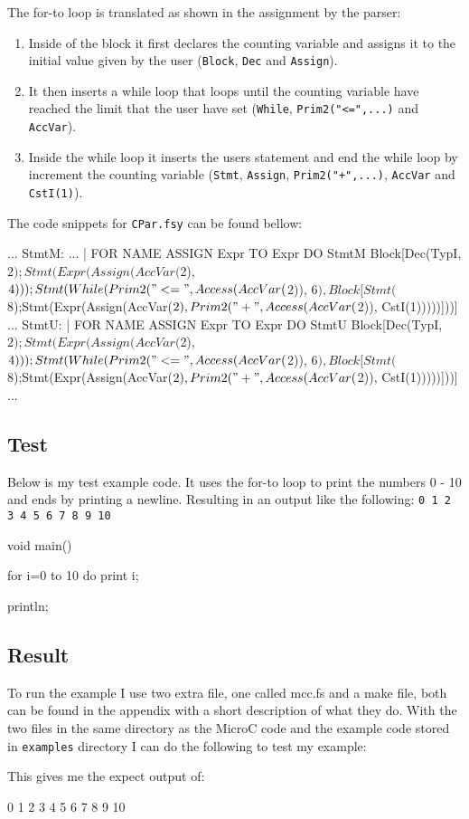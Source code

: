 The for-to loop is translated as shown in the assignment by the parser: 
\begin{enumerate}
    \item Inside of the block it first declares the counting variable and
        assigns it to the initial value given by the user (\texttt{Block},
        \texttt{Dec} and \texttt{Assign}).
    \item It then inserts a while loop that loops until the counting variable
        have reached the limit that the user have set (\texttt{While},
        \texttt{Prim2("<=",...)} and \texttt{AccVar}).
    \item Inside the while loop it inserts the users statement and end the while
        loop by increment the counting variable (\texttt{Stmt}, \texttt{Assign},
        \texttt{Prim2("+",...)}, \texttt{AccVar} and \texttt{CstI(1)}).
\end{enumerate}
The code snippets for \texttt{CPar.fsy} can be found bellow:
\begin{ccode}
...
StmtM:
...
  | FOR NAME ASSIGN Expr TO Expr DO StmtM { Block[Dec(TypI, $2); Stmt(Expr(Assign(AccVar($2), $4))); Stmt(While(Prim2("<=", Access(AccVar($2)), $6), Block[Stmt($8);Stmt(Expr(Assign(AccVar($2), Prim2("+", Access(AccVar($2)), CstI(1)))))]))] }
...
StmtU:
  | FOR NAME ASSIGN Expr TO Expr DO StmtU { Block[Dec(TypI, $2); Stmt(Expr(Assign(AccVar($2), $4))); Stmt(While(Prim2("<=", Access(AccVar($2)), $6), Block[Stmt($8);Stmt(Expr(Assign(AccVar($2), Prim2("+", Access(AccVar($2)), CstI(1)))))]))] }
...
\end{ccode}
\subsection{Test}
Below is my test example code. It uses the for-to loop to print the numbers 0 - 10
and ends by printing a newline. Resulting in an output like the following:
\texttt{0 1 2 3 4 5 6 7 8 9 10}
\begin{ccode}
void main() {
  for i=0 to 10 do 
    print i;

  println;
}
\end{ccode}
\subsection{Result}
To run the example I use two extra file, one called mcc.fs and a make file, both can
be found in the appendix with a short description of what they do. With the two
files in the same directory as the MicroC code and the example code stored in
\texttt{examples} directory I can do the following to test my example:
\begin{bashcode}
\end{bashcode}
This gives me the expect output of:
\begin{bashcode}
0 1 2 3 4 5 6 7 8 9 10

\end{bashcode}

